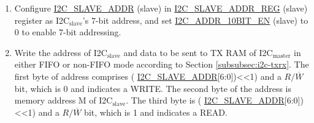 \documentclass[main\_\_EN.tex]{subfiles}
\begin{document}
\begin{enumerate}
\item Configure \hyperref[fielddesc:I2CSLAVEADDR]{I2C\_SLAVE\_ADDR} (slave) in \hyperref[regdesc:I2CSLAVEADDRREG]{I2C\_SLAVE\_ADDR\_REG} (slave) register as I2C$_\text{slave}$'s 7-bit address, and set \hyperref[fielddesc:I2CADDR10BITEN]{I2C\_ADDR\_10BIT\_EN} (slave) to 0 to enable 7-bit addressing.
\item Write the address of I2C$_\text{slave}$ and data to be sent to TX RAM of I2C$_\text{master}$ in either FIFO or non-FIFO mode according to Section \ref{subsubsec:i2c-txrx}. The first byte of address comprises ( \hyperref[fielddesc:I2CSLAVEADDR]{I2C\_SLAVE\_ADDR}[6:0])<<1) and a $R/\overline W$ bit, which is 0 and indicates a WRITE. The second byte of the address is memory address M of I2C$_\text{slave}$. The third byte is ( \hyperref[fielddesc:I2CSLAVEADDR]{I2C\_SLAVE\_ADDR}[6:0])<<1) and a $R/\overline W$ bit, which is 1 and indicates a READ.


\end{enumerate}
\end{document}
